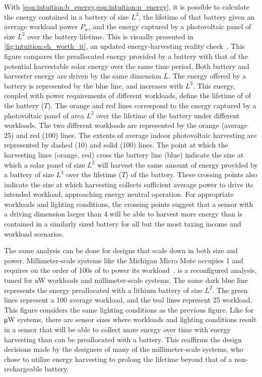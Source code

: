 With \cref{eqn:intuition:b_energy,eqn:intuition:p_energy}, it is possible to calculate the energy contained in a battery of size $L^3$, the lifetime of that battery given an average workload power $P_w$, and the energy captured by a photovoltaic panel of size $L^2$ over the battery lifetime.
This is visually presented in \cref{fig:intuition:eh_worth_it},
an updated energy-harvesting reality check~\cite{yervaGrafting12}.
This figure compares the preallocated energy provided by a battery with that of the potential harvestable solar energy over the same time period.
Both battery and harvester energy are driven by the same dimension $L$.
The energy offered by a battery is represented by the blue line, and increases with $L^3$.
This energy, coupled with power requirements of different workloads, define the lifetime of of the battery ($T$).
The orange and red lines correspond to the energy captured by a photovoltaic panel of area $L^2$ over the lifetime of the battery under different workloads.
The two different workloads are represented by the orange (average 25\ssi{\micro\watt}) and red (100\ssi{\micro\watt}) lines.
The extents of average indoor photovoltaic harvesting are represented by dashed
(10\ssi[per-mode=symbol]{\micro\watt\per\centi\meter\squared}) and solid
(100\ssi[per-mode=symbol]{\micro\watt\per\centi\meter\squared}) lines.
The point at which the harvesting lines (orange, red) cross the battery line (blue) indicate the size at which a solar panel of size $L^2$ will harvest the same amount of energy provided by a battery of size $L^3$ over the lifetime ($T$) of the battery.
These crossing points also indicate the size at which harvesting collects sufficient average power to drive its intended workload, approaching energy neutral operation.
For appropriate workloads and lighting conditions, the crossing points suggest that a sensor with a driving dimension larger than 4\ssi{\centi\meter} will be able to harvest more energy than is contained in a similarly sized battery for all but the most taxing income and workload scenarios. 


The same analysis can be done for designs that scale down in both size and power. Millimeter-scale systems like the Michigan Micro Mote occupies 1\ssi{\milli\meter\squared} and requires on the order of 100s of \ssi{\nano\watt} to power its workload~\cite{lee2013modular}.
 is a reconfigured analysis, tuned for \si{\nano\watt} workloads and millimeter-scale systems. The same dark blue line represents the energy preallocated with a lithium battery of size $L^2$. The green lines represent a 100\ssi{\nano\watt} average workload, and the teal lines represent 25\ssi{\nano\watt} workload. This figure considers the same lighting conditions as the previous figure.
Like for \si{\micro\watt} systems, there are sensor sizes where workloads and lighting conditions result in a sensor that will be able to collect more energy over time with energy harvesting than can be preallocated with a battery.
This reaffirms the design decisions made by the designers of many of the millimeter-scale systems, who chose to utilize energy harvesting to prolong the lifetime beyond that of a non-rechargeable battery.


